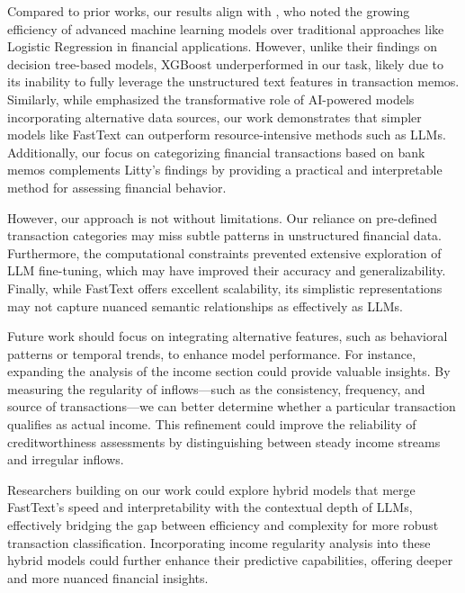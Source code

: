 \documentclass[12pt,letterpaper]{article}
\begin{document}
Compared to prior works, our results align with \cite{markov2022credit}, who noted the growing efficiency of advanced machine learning models over traditional approaches like Logistic Regression in financial applications. However, unlike their findings on decision tree-based models, XGBoost underperformed in our task, likely due to its inability to fully leverage the unstructured text features in transaction memos. Similarly, while \cite{litty2024beyond} emphasized the transformative role of AI-powered models incorporating alternative data sources, our work demonstrates that simpler models like FastText can outperform resource-intensive methods such as LLMs. Additionally, our focus on categorizing financial transactions based on bank memos complements Litty’s findings by providing a practical and interpretable method for assessing financial behavior.  

However, our approach is not without limitations. Our reliance on pre-defined transaction categories may miss subtle patterns in unstructured financial data. Furthermore, the computational constraints prevented extensive exploration of LLM fine-tuning, which may have improved their accuracy and generalizability. Finally, while FastText offers excellent scalability, its simplistic representations may not capture nuanced semantic relationships as effectively as LLMs.  

Future work should focus on integrating alternative features, such as behavioral patterns or temporal trends, to enhance model performance. For instance, expanding the analysis of the income section could provide valuable insights. By measuring the regularity of inflows—such as the consistency, frequency, and source of transactions—we can better determine whether a particular transaction qualifies as actual income. This refinement could improve the reliability of creditworthiness assessments by distinguishing between steady income streams and irregular inflows.

 Researchers building on our work could explore hybrid models that merge FastText's speed and interpretability with the contextual depth of LLMs, effectively bridging the gap between efficiency and complexity for more robust transaction classification. Incorporating income regularity analysis into these hybrid models could further enhance their predictive capabilities, offering deeper and more nuanced financial insights.


\end{document}
